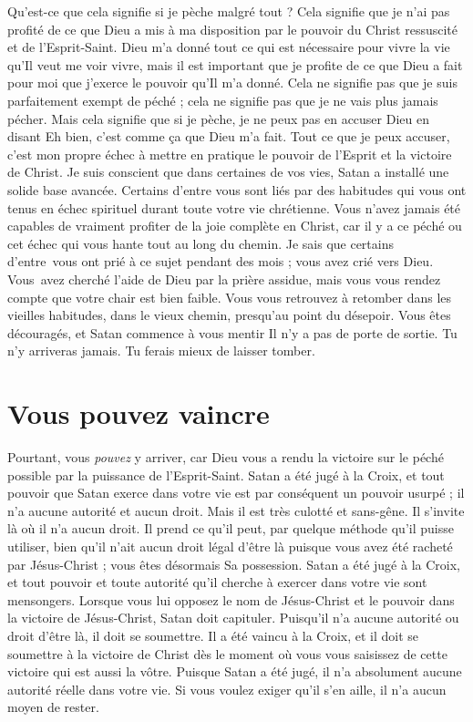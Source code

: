 Qu'est-ce que cela signifie si je pèche malgré tout ?
 Cela signifie que je n'ai pas profité de ce que Dieu a mis à ma disposition
 par le pouvoir du Christ ressuscité et de l'Esprit-Saint.
 Dieu m'a donné tout ce qui est nécessaire pour vivre la vie
 qu'Il veut me voir vivre, mais il est important que je profite
 de ce que Dieu a fait pour moi \ocadr que j'exerce le pouvoir
 qu'Il m'a donné.
 Cela ne signifie pas que je suis parfaitement exempt de péché ;
 cela ne signifie pas que je ne vais plus jamais pécher.
 Mais cela signifie que si je pèche, je ne peux pas en accuser Dieu
 en disant\frcolon{}
 \Og Eh bien, c'est comme ça que Dieu m'a fait. \Fg{}
 Tout ce que je peux accuser, c'est mon propre échec à mettre en pratique
 le pouvoir de l'Esprit et la victoire de Christ.
 Je suis conscient que dans certaines de vos vies,
 Satan a installé une solide base avancée.
 Certains d'entre vous sont liés par des habitudes qui vous ont tenus
 en échec spirituel durant toute votre vie chrétienne.
 Vous n'avez jamais été capables de vraiment profiter de la joie complète
 en Christ, car il y a ce péché ou cet échec qui vous hante
 tout au long du chemin. Je sais que certains d'entre~vous ont prié
 à ce sujet pendant des mois ; vous avez crié vers Dieu.
 Vous~avez cherché l'aide de Dieu par la prière assidue,
 mais vous vous rendez compte que votre chair est bien faible.
 Vous vous retrouvez à retomber dans les vieilles habitudes,
 dans le vieux chemin, presqu'au point du désepoir.
 Vous êtes découragés, et Satan commence à vous mentir\frcolon{}
 \Og Il n'y a pas de porte de sortie. Tu n'y arriveras jamais.
 Tu ferais mieux de laisser tomber. \Fg{}
 \nowidow[4]


\section{Vous pouvez vaincre}

Pourtant, vous \emph{pouvez} y arriver, car Dieu vous a rendu la victoire
 sur le péché possible par la puissance de l'Esprit-Saint.
 Satan a été jugé à la Croix, et tout pouvoir que Satan exerce
 dans votre vie est par conséquent un pouvoir usurpé ;
 il n'a aucune autorité et aucun droit.
 Mais il est très culotté et sans-gêne. Il s'invite là où il n'a aucun
 droit. Il prend ce qu'il peut, par quelque méthode qu'il puisse utiliser,
 bien qu'il n'ait aucun droit légal d'être là puisque vous avez été racheté
 par Jésus-Christ ; vous êtes désormais Sa possession.
 Satan a été jugé à la Croix, et tout pouvoir et toute autorité qu'il cherche
 à exercer dans votre vie sont mensongers.
 Lorsque vous lui opposez le nom de Jésus-Christ et le pouvoir
 dans la victoire de Jésus-Christ, Satan doit capituler.
 Puisqu'il n'a aucune autorité ou droit d'être là, il doit se soumettre.
 Il a été vaincu à la Croix, et il doit se soumettre à la victoire de Christ
 dès le moment où vous vous saisissez de cette victoire qui est aussi la vôtre.
 Puisque Satan a été jugé, il n'a absolument aucune autorité réelle
 dans votre vie. Si vous voulez exiger qu'il s'en aille,
 il n'a aucun moyen de rester.


